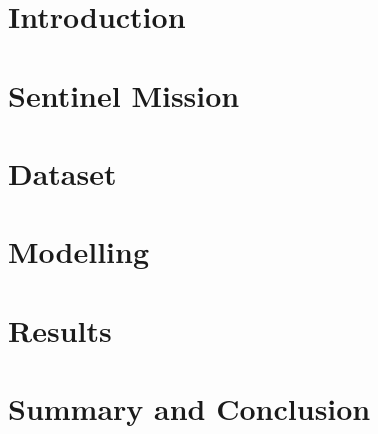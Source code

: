 \documentclass[12pt, a4paper]{report}
\begin{document}





\tableofcontents

\chapter{Introduction}


\chapter{Sentinel Mission}


\chapter{Dataset}


\chapter{Modelling}


\chapter{Results}


\chapter{Summary and Conclusion}




\end{document}
